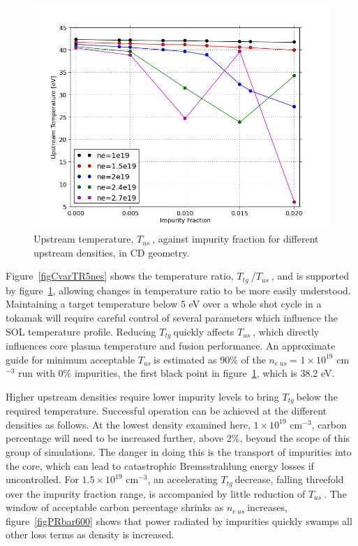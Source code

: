 \documentclass[12pt]{article}  %
\providecommand{\noNe}[1]{{${#1}\times 10^{19}$ cm$^{-3}$}} %
\providecommand{\neus}{$n_{e~us}~$} %
\providecommand{\Tus}{$T_{us}~$} %
\providecommand{\Ttg}{$T_{tg}~$} %
\begin{document}
\begin{figure}
\includegraphics[scale=0.6]{Figures/sol1d/CvarTus.png}
\centering
\caption{Upstream temperature, \Tus, against impurity fraction for different upstream densities, in CD geometry.}\label{figCvarTus}
\end{figure}

Figure~\ref{figCvarTR5nes} shows the temperature ratio, \Ttg/\Tus, and is supported by figure~\ref{figCvarTus}, allowing changes in temperature ratio to be more easily understood. Maintaining a target temperature below 5 eV over a whole shot cycle in a tokamak will require careful control of several parameters which influence the SOL temperature profile. Reducing \Ttg quickly affects \Tus, which directly influences core plasma temperature and fusion performance. An approximate guide for minimum acceptable \Tus is estimated as 90\% of the \neus = \noNe{1} run with 0\% impurities, the first black point in figure~\ref{figCvarTus}, which is 38.2 eV. 

Higher upstream densities require lower impurity levels to bring \Ttg below the required temperature. Successful operation can be achieved at the different densities as follows. At the lowest density examined here, \noNe{1}, carbon percentage will need to be increased further, above 2\%, beyond the scope of this group of simulations. The danger in doing this is the transport of impurities into the core, which can lead to catastrophic Bremsstrahlung energy losses if uncontrolled. For \noNe{1.5}, an accelerating \Ttg decrease, falling threefold over the impurity fraction range, is accompanied by little reduction of \Tus. The window of acceptable carbon percentage shrinks as \neus increases, figure~\ref{figPRbar600} shows that power radiated by impurities quickly swamps all other loss terms as density is increased.
\end{document}
